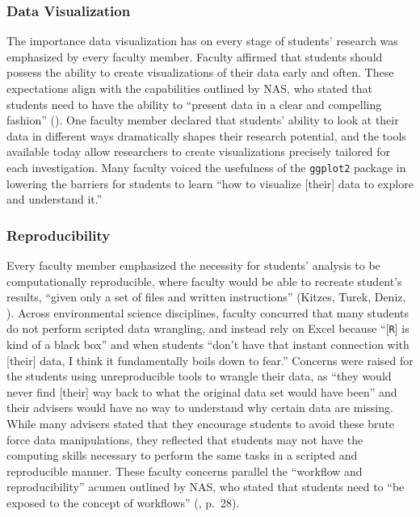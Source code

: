 \documentclass[12pt]{article}
\begin{document}
\subsubsection{Data Visualization} 

\noindent The importance data visualization has on every stage of students'
research was emphasized by every faculty member. Faculty affirmed
that students should possess the ability to create visualizations of their data
early and often. These expectations align with the capabilities outlined by
NAS, who stated that students need to have the ability to ``present data in a
clear and compelling fashion'' (\citeyear[p.\ 26]{nas}). One faculty member
declared that students' ability to look at their data in different ways
dramatically shapes their research potential, and the tools available today
allow researchers to create visualizations precisely tailored for each
investigation. Many faculty voiced the usefulness of the \texttt{ggplot2} 
package \citep{ggplot} in lowering the barriers for students to learn ``how to
visualize [their] data to explore and understand it.'' 

\subsubsection{Reproducibility}  

\noindent Every faculty member emphasized the necessity for students' analysis
to be computationally reproducible, where faculty would be able to recreate 
student's results, ``given only a set of files and written instructions''
(Kitzes, Turek, Deniz, \citeyear{reproducible}). Across environmental science
disciplines, faculty concurred that many students do not perform scripted data
wrangling, and instead rely on Excel because ``[\texttt{R}] is kind of a black
box'' and when students ``don't have that instant connection with [their] data,
I think it fundamentally boils down to fear.'' Concerns were raised for the
students using unreproducible tools to wrangle their data, as ``they would never
find [their] way back to what the original data set would have been'' and their
advisers would have no way to understand why certain data are missing. While
many advisers stated that they encourage students to avoid these brute force
data manipulations, they reflected that students may not have the computing
skills necessary to perform the same tasks in a scripted and reproducible
manner. These faculty concerns parallel the ``workflow and reproducibility''
acumen outlined by NAS, who stated that students need to ``be exposed to the
concept of workflows'' (\citeyear{nas}, p.\ 28). 
\end{document}
